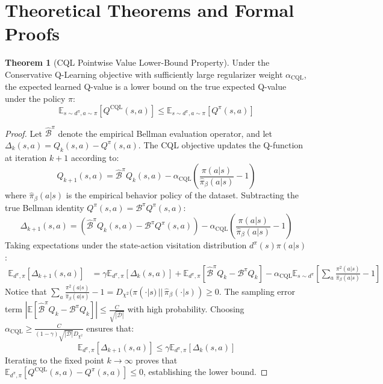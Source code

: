 \documentclass[11pt,a4paper]{article}
\theoremstyle{definition}
\newtheorem{theorem}{\textbf{Theorem}}[section]
\begin{document}
\section{Theoretical Theorems and Formal Proofs}

\begin{theorem}[CQL Pointwise Value Lower-Bound Property]
Under the Conservative Q-Learning objective with sufficiently large regularizer weight $\alpha_{\text{CQL}}$, the expected learned Q-value is a lower bound on the true expected Q-value under the policy $\pi$:
{\boldmath
\begin{equation}
\mathbb{E}_{s \sim d^\pi, a \sim \pi}[Q^{\text{CQL}}(s, a)] \le \mathbb{E}_{s \sim d^\pi, a \sim \pi}[Q^\pi(s, a)]
\end{equation}
}
\end{theorem}

\begin{proof}
Let $\hat{\mathcal{B}}^\pi$ denote the empirical Bellman evaluation operator, and let $\Delta_k(s, a) = Q_k(s, a) - Q^\pi(s, a)$.
The CQL objective updates the Q-function at iteration $k+1$ according to:
{\boldmath
\begin{equation}
Q_{k+1}(s, a) = \hat{\mathcal{B}}^\pi Q_k(s, a) - \alpha_{\text{CQL}} \left( \frac{\pi(a | s)}{\hat{\pi}_\beta(a | s)} - 1 \right)
\end{equation}
}
where $\hat{\pi}_\beta(a | s)$ is the empirical behavior policy of the dataset.
Subtracting the true Bellman identity $Q^\pi(s, a) = \mathcal{B}^\pi Q^\pi(s, a)$:
{\boldmath
\begin{equation}
\Delta_{k+1}(s, a) = \left( \hat{\mathcal{B}}^\pi Q_k(s, a) - \mathcal{B}^\pi Q^\pi(s, a) \right) - \alpha_{\text{CQL}} \left( \frac{\pi(a | s)}{\hat{\pi}_\beta(a | s)} - 1 \right)
\end{equation}
}
Taking expectations under the state-action visitation distribution $d^\pi(s)\pi(a | s)$:
{\boldmath
\begin{align}
\mathbb{E}_{d^\pi, \pi}[\Delta_{k+1}(s, a)] &= \gamma \mathbb{E}_{d^\pi, \pi}[\Delta_k(s, a)] + \mathbb{E}_{d^\pi, \pi}[\hat{\mathcal{B}}^\pi Q_k - \mathcal{B}^\pi Q_k] - \alpha_{\text{CQL}} \mathbb{E}_{s \sim d^\pi}\left[ \sum_a \frac{\pi^2(a|s)}{\hat{\pi}_\beta(a|s)} - 1 \right]
\end{align}
}
Notice that $\sum_a \frac{\pi^2(a|s)}{\hat{\pi}_\beta(a|s)} - 1 = D_{\chi^2}(\pi(\cdot|s) \,||\, \hat{\pi}_\beta(\cdot|s)) \ge 0$.
The sampling error term $|\mathbb{E}[\hat{\mathcal{B}}^\pi Q_k - \mathcal{B}^\pi Q_k]| \le \frac{C}{\sqrt{|\mathcal{D}|}}$ with high probability.
Choosing $\alpha_{\text{CQL}} \ge \frac{C}{(1 - \gamma) \sqrt{|\mathcal{D}|} D_{\chi^2}}$ ensures that:
{\boldmath
\begin{equation}
\mathbb{E}_{d^\pi, \pi}[\Delta_{k+1}(s, a)] \le \gamma \mathbb{E}_{d^\pi, \pi}[\Delta_k(s, a)]
\end{equation}
}
Iterating to the fixed point $k \to \infty$ proves that $\mathbb{E}_{d^\pi, \pi}[Q^{\text{CQL}}(s, a) - Q^\pi(s, a)] \le 0$, establishing the lower bound.
\end{proof}
\end{document}
